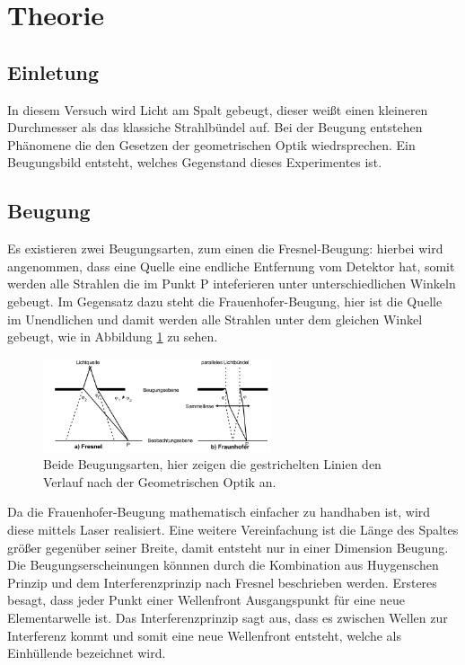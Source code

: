 \section{Theorie}
\label{sec:Theorie}

\subsection{Einletung}
In diesem Versuch wird Licht am Spalt gebeugt, dieser weißt einen kleineren Durchmesser als das klassiche
Strahlbündel auf. Bei der Beugung entstehen Phänomene die den Gesetzen der geometrischen Optik wiedrsprechen.
Ein Beugungsbild entsteht, welches Gegenstand dieses Experimentes ist.

\subsection{Beugung}
Es existieren zwei Beugungsarten, zum einen die Fresnel-Beugung: hierbei wird angenommen, dass eine
Quelle eine endliche Entfernung vom Detektor hat, somit werden alle Strahlen die im Punkt P inteferieren
unter unterschiedlichen Winkeln gebeugt. Im Gegensatz dazu steht die Frauenhofer-Beugung, hier ist
die Quelle im Unendlichen und damit werden alle Strahlen unter dem gleichen Winkel gebeugt, wie in Abbildung
\ref{fig:BA} zu sehen.
 \begin{figure}
  \centering
  \includegraphics[width=0.6\textwidth]{BA.PNG}
  \caption{Beide Beugungsarten, hier zeigen die gestrichelten Linien den Verlauf nach der Geometrischen Optik an.\cite{sample}}
  \label{fig:BA}
\end{figure}
Da die Frauenhofer-Beugung mathematisch einfacher zu handhaben ist, wird diese mittels Laser realisiert.
Eine weitere Vereinfachung ist die Länge des Spaltes größer gegenüber seiner Breite, damit entsteht nur
in einer Dimension Beugung.
Die Beugungserscheinungen könnnen durch die Kombination aus Huygenschen Prinzip und dem Interferenzprinzip nach Fresnel beschrieben werden.
Ersteres besagt, dass jeder Punkt einer Wellenfront Ausgangspunkt für eine neue Elementarwelle ist.
Das Interferenzprinzip sagt aus, dass es zwischen Wellen zur Interferenz kommt und somit eine neue Wellenfront
entsteht, welche als Einhüllende bezeichnet wird.
